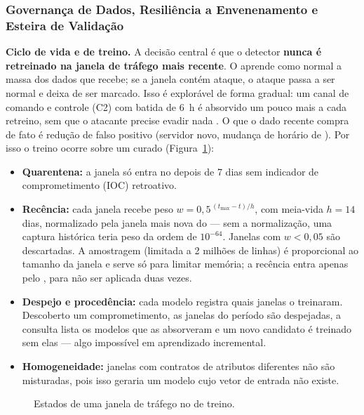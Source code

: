 \subsubsection{Governança de Dados, Resiliência a Envenenamento e Esteira de Validação}
\label{sec:governanca}

\textbf{Ciclo de vida e  de treino.} A decisão central é que o detector
\textbf{nunca é retreinado na janela de tráfego mais recente}. O
 aprende como normal a massa dos dados que recebe; se a janela
contém ataque, o ataque passa a ser normal e deixa de ser marcado. Isso é
explorável de forma gradual: um canal de comando e controle (C2) com batida de 6~h
é absorvido um pouco mais a cada retreino, sem que o atacante precise evadir nada
\cite{Biggio2012Poisoning}. O que o dado recente compra de fato é redução de falso
positivo (servidor novo, mudança de horário de ). Por isso o treino
ocorre sobre um  curado (Figura~\ref{fig:ciclo}):

\begin{itemize}
  \item \textbf{Quarentena:} a janela só entra no  depois de 7 dias sem
  indicador de comprometimento (IOC) retroativo.
  \item \textbf{Recência:} cada janela recebe peso
  $w = 0{,}5^{\,(t_{\max}-t)/h}$, com meia-vida $h = 14$ dias, normalizado pela
  janela mais nova do  --- sem a normalização, uma captura histórica teria
  peso da ordem de $10^{-64}$. Janelas com $w < 0{,}05$ são descartadas. A
  amostragem (limitada a 2 milhões de linhas) é proporcional ao tamanho da janela e
  serve só para limitar memória; a recência entra apenas pelo ,
  para não ser aplicada duas vezes.
  \item \textbf{Despejo e procedência:} cada modelo registra quais janelas o
  treinaram. Descoberto um comprometimento, as janelas do período são despejadas,
  a consulta  lista os modelos que as absorveram e um
  novo candidato é treinado sem elas --- algo impossível em aprendizado incremental.
  \item \textbf{Homogeneidade:} janelas com contratos de atributos diferentes não
  são misturadas, pois isso geraria um modelo cujo vetor de entrada não existe.
\end{itemize}

\begin{figure}[H]
  \centering
  
  \caption{Estados de uma janela de tráfego no  de treino.}
  \label{fig:ciclo}
\end{figure}

